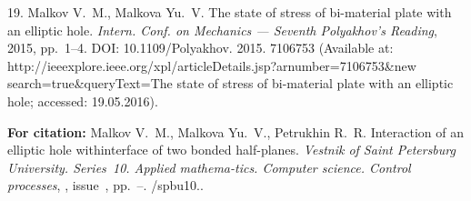 {19. Malkov V.~M.,  Malkova Yu.~V. The state of stress of
bi-material plate with an elliptic hole. {\it Intern. Conf. on
Mechanics --- Seventh Polyakhov's Reading}, 2015,  pp.~1--4. DOI:
10.1109/Polyakhov. 2015. 7106753 (Available at:
http://ieeexplore.ieee.org/xpl/articleDetails.jsp?arnumber=7106753\&new\linebreak
\noindent search=true\&queryText=The state of stress of
bi-material plate with an elliptic hole; accessed: 19.05.2016).



\vskip 2mm

{\bf For citation:} Malkov V.~M., Malkova Yu.~V., Petrukhin R.~R.
Interaction of an elliptic hole with\linebreak interface of two
bonded half-planes. {\it Vestnik of Saint Petersburg University.
Series~10. Applied mathema-\linebreak tics. Computer science.
Control processes}, \issueyear, issue~\issuenum,
pp.~\pageref{p7}--\pageref{p7e}.
\doivyp/spbu10.\issueyear.


}
